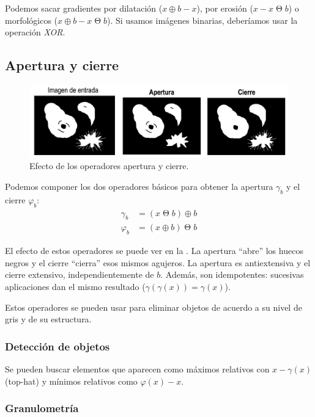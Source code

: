 \documentclass[nochap,palatino,notitlepage]{apuntes}
\DeclareMathOperator{\erd}{\Theta}
\begin{document}
Podemos sacar gradientes por dilatación ($x \oplus b - x$), por erosión ($x - x \erd b$) o morfológicos ($x\oplus b - x \erd b$). Si usamos imágenes binarias, deberíamos usar la operación \textit{XOR}.

\subsection{Apertura y cierre}

\begin{figure}[hbtp]
\centering
\includegraphics[width=\textwidth]{img/AperturaCierre.png}
\caption{Efecto de los operadores apertura y cierre.}
\label{fig:AperturaCierre}
\end{figure}

Podemos componer los dos operadores básicos para obtener la apertura $γ_b$ y el cierre $φ_b$: \begin{align*}
γ_b &= (x \erd b) \oplus b \\
φ_b &= (x \oplus b) \erd b
\end{align*}

El efecto de estos operadores se puede ver en la . La apertura ``abre'' los huecos negros y el cierre ``cierra'' esos mismos agujeros. La apertura es antiextensiva y el cierre extensivo, independientemente de $b$. Además, son idempotentes: sucesivas aplicaciones dan el mismo resultado ($γ(γ(x)) = γ(x)$).

Estos operadores se pueden usar para eliminar objetos de acuerdo a su nivel de gris y de su estructura.

\subsubsection{Detección de objetos}

Se pueden buscar elementos que aparecen como máximos relativos con $x - γ(x)$  (top-hat) y mínimos relativos como $φ(x) - x$.

\subsubsection{Granulometría}
\end{document}
